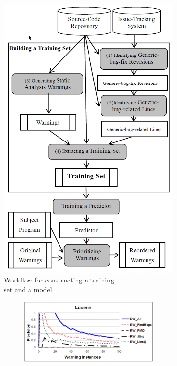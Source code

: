  \begin{figure}[H]
     \begin{subfigure}{0.5\textwidth}
         \centering
         \includegraphics[scale=0.3]{./src/automatic_training_set_workflow.png}
         \caption{Workflow for constructing a training\\ set and a model}\label{automatic_training_set:workflow}
     \end{subfigure}%
     \begin{subfigure}{0.5\textwidth}
         \begin{subfigure}{.5\textwidth}
             \centering
             \includegraphics[scale=0.35]{./src/automatic_training_set_results1.png}

\end{subfigure}
\end{subfigure}
\end{figure}
